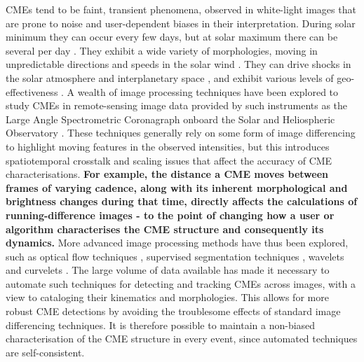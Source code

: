 \documentclass[referee,a4paper,12pt,traditabstract]{swsc}
\begin{document}
\begin{linenumbers}
CMEs tend to be faint, transient phenomena, observed in white-light images that are prone to noise and user-dependent biases in their interpretation. During solar minimum they can occur every few days, but at solar maximum there can be several per day \citep{2000JGR...10518169S, 2004JGRA..10907105Y}. They exhibit a wide variety of morphologies, moving in unpredictable directions and speeds in the solar wind \citep{angeo-27-4491-2009, 2010NatCo...1E..74B, 2014NatCo...5E3481L}. They can drive shocks in the solar atmosphere and interplanetary space \citep{2005A&A...440..373H, 2013NatPh...9..811C}, and exhibit various levels of geo-effectiveness \citep{2001JASTP..63..389P, 2005AnGeo..23.1033S, 2009GeoRL..3608102D, 2012SoPh..tmp...47L}. A wealth of image processing techniques have been explored to study CMEs in remote-sensing image data provided by such instruments as the Large Angle Spectrometric Coronagraph \citep[LASCO;][]{1995SoPh..162..357B} onboard the Solar and Heliospheric Observatory \citep[SOHO;][]{1995SoPh..162....1D}. These techniques generally rely on some form of image differencing to highlight moving features in the observed intensities, but this introduces spatiotemporal crosstalk and scaling issues that affect the accuracy of CME characterisations. {\bf For example, the distance a CME moves between frames of varying cadence, along with its inherent morphological and brightness changes during that time, directly affects the calculations of running-difference images - to the point of changing how a user or algorithm characterises the CME structure and consequently its dynamics.} More advanced image processing methods have thus been explored, such as optical flow techniques \citep{2006ApJ...652.1747C}, supervised segmentation techniques \citep{Goussies:2010:DTC:1749630.1750150}, wavelets \citep{2003A&A...398.1185S} and curvelets \citep{2011AdSpR..47.2118G}. The large volume of data available has made it necessary to automate such techniques for detecting and tracking CMEs across images, with a view to cataloging their kinematics and morphologies. This allows for more robust CME detections by avoiding the troublesome effects of standard image differencing techniques. It is therefore possible to maintain a non-biased characterisation of the CME structure in every event, since automated techniques are self-consistent.


\end{linenumbers}
\end{document}
